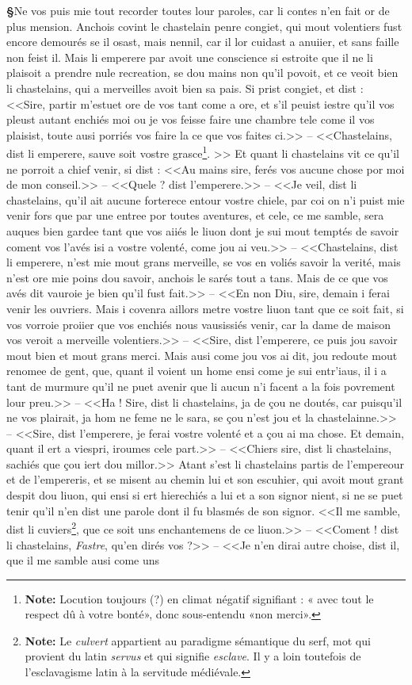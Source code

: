 \documentclass[12pt]{article} %
\newcommand{\colmar}[1]{\marginnote{[#1]}}          %
\newcommand{\persName}[1]{\emph{#1}} %
\newcommand{\supplied}[1]{\textlangle#1\textrangle} %
\newcommand{\fnnote}[1]{\footnote{\textbf{Note:} #1}} %
\newcounter{paranum}
\newcommand{\pnum}{\stepcounter{paranum}\textbf{§\arabic{paranum}}\quad}
\begin{document}
\pnum Ne vos puis mie tout recorder toutes lour paroles, car li contes n'en fait or de plus mension. Anchois covint le chastelain penre congiet, qui mout volentiers fust encore demourés se il osast, mais nennil, car il lor cuidast a anuiier, et sans faille non feist il. Mais li emperere par avoit une conscience si estroite que il ne li plaisoit a prendre nule recreation, se dou mains non qu'il povoit, et ce veoit bien li chastelains, qui a merveilles avoit bien sa pais. Si prist congiet, et dist : <<Sire, partir m'estuet ore de vos tant come a ore, et s'il peuist iestre qu'il vos pleust autant enchiés moi ou je vos feisse faire une chambre tele come il vos plaisist, toute ausi porriés vos faire la ce que vos faites ci.>> -- <<Chastelains, dist li emperere, sauve soit vostre grasce\fnnote{Locution toujours (?) en climat négatif signifiant : « avec tout le respect dû à votre bonté», donc sous-entendu «non merci».}. >> Et quant li chastelains vit ce qu'il ne porroit a chief venir, si dist : <<Au mains sire, ferés vos aucune chose por moi de mon conseil.>> -- <<Quele ? dist l'emperere.>> -- <<Je veil, dist li chastelains, qu'il ait aucu\colmar{11vb}\colmar{b}ne forterece entour vostre chiele, par coi on n'i puist mie venir fors que par une entree por toutes aventures, et cele, ce me samble, sera auques bien gardee tant que vos aiiés le liuon dont je sui mout temptés de savoir coment vos l'avés isi a vostre volenté, come jou ai veu.>> -- <<Chastelains, dist li emperere, n'est mie mout grans merveille, se vos en voliés savoir la verité, mais n'est ore mie poins dou savoir, anchois le sarés tout a tans. Mais de ce que vos avés dit vauroie je bien qu'il fust fait.>> -- <<En non Diu, sire, demain i ferai venir les ouvriers. Mais i covenra aillors metre vostre liuon tant que ce soit fait, si vos vorroie proiier que vos enchiés nous vausissiés venir, car la dame de maison vos veroit a merveille volentiers.>> -- <<Sire, dist l'emperere, ce puis jou savoir mout bien et mout grans merci. Mais ausi come jou vos ai dit, jou redoute mout renomee de gent, que, quant il voient un home ensi come je sui entr'iaus, il i a tant de murmure qu'il ne puet avenir que li aucun n'i facent a la fois povreme\supplied{n}t lour preu.>> -- <<Ha ! Sire, dist li chastelains, ja de çou ne doutés, car puisqu'il ne vos plairait, ja hom ne feme ne le sara, se çou n'est jou et la chastelainne.>> -- <<Sire, dist l'emperere, je ferai vostre volenté et a çou ai ma chose. Et demain, quant il ert a viespri, iroumes cele part.>> -- <<Chiers sire, dist li chastelains, sachiés que çou iert dou millor.>> Atant s'est li chastelains partis de l'empereour et de l'empereris, et se misent au chemin lui et son escuhier, qui avoit mout grant despit dou liuon, qui ensi si ert hierechiés a lui et a son signor nient, si ne se puet tenir qu'il n'en dist une parole dont il fu blasmés de son signor. <<Il me samble, dist li cuviers\fnnote{Le \textit{culvert} appartient au paradigme sémantique du serf, mot qui provient du latin \textit{servus} et qui signifie \textit{esclave}. Il y a loin toutefois de l'esclavagisme latin à la servitude médiévale. }, que ce soit uns enchantemens de ce liuon.>> -- <<Coment ! dist li chastelains, \persName{Fastre}, qu'en dirés vos ?>> -- <<Je n'en dirai autre choise, dist il, que il me samble ausi come uns 
\end{document}
